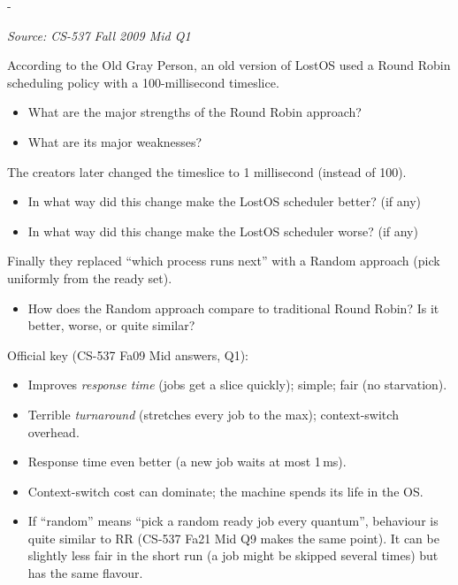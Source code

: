 \documentclass[11pt,a4paper]{article}
\makeatletter
\newcommand{\keepspace}[1]{\par\penalty-100\begingroup
  \setlength{\dimen@}{#1}\dimen@ii\pagegoal\advance\dimen@ii-\pagetotal
  \ifdim\dimen@>\dimen@ii\ifdim\dimen@ii>\z@\vfil\fi\break\fi\endgroup}
\newcounter{qn}[section]
\newenvironment{Qn}[4]{%
  \refstepcounter{qn}\keepspace{7\baselineskip}%
  \begin{tcolorbox}[qboxstyle, title={Q\thesection.\theqn\ \ [#1 \textbar\ #2]\ \ #4}]%
  {\footnotesize\color{g3}\textit{Source: #3}}\par\smallskip%
}{%
  \end{tcolorbox}%
}
\newenvironment{Sol}{%
  \begin{tcolorbox}[sboxstyle, title={Solution}]%
}{%
  \end{tcolorbox}\vspace{0.35em}%
}
\makeatother
\begin{document}
\begin{Qn}{Medium}{Lect 5--6}{CS-537 Fall 2009 Mid Q1}{RR at 100\,ms vs.\ 1\,ms vs.\ random}
According to the Old Gray Person, an old version of LostOS used a Round Robin scheduling policy with a 100-millisecond timeslice.
\begin{itemize}
  \item[(a)] What are the major strengths of the Round Robin approach?
  \item[(b)] What are its major weaknesses?
\end{itemize}
The creators later changed the timeslice to 1 millisecond (instead of 100).
\begin{itemize}
  \item[(c)] In what way did this change make the LostOS scheduler better? (if any)
  \item[(d)] In what way did this change make the LostOS scheduler worse? (if any)
\end{itemize}
Finally they replaced ``which process runs next'' with a Random approach (pick uniformly from the ready set).
\begin{itemize}
  \item[(e)] How does the Random approach compare to traditional Round Robin? Is it better, worse, or quite similar?
\end{itemize}
\end{Qn}
\begin{Sol}
Official key (CS-537 Fa09 Mid answers, Q1):
\begin{itemize}
  \item[(a)] Improves \emph{response time} (jobs get a slice quickly); simple; fair (no starvation).
  \item[(b)] Terrible \emph{turnaround} (stretches every job to the max); context-switch overhead.
  \item[(c)] Response time even better (a new job waits at most 1\,ms).
  \item[(d)] Context-switch cost can dominate; the machine spends its life in the OS.
  \item[(e)] If ``random'' means ``pick a random ready job every quantum'', behaviour is quite similar to RR (CS-537 Fa21 Mid Q9 makes the same point). It can be slightly less fair in the short run (a job might be skipped several times) but has the same flavour.
\end{itemize}
\end{Sol}
\end{document}
